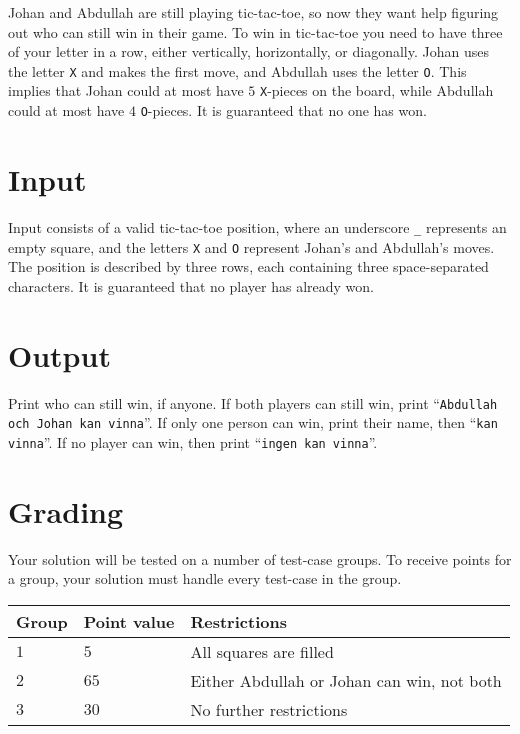 \noindent
Johan and Abdullah are still playing tic-tac-toe, so now they want help figuring out who can still win in their game.
To win in tic-tac-toe you need to have three of your letter in a row, either vertically, horizontally, or diagonally.
Johan uses the letter \texttt{X} and makes the first move, and Abdullah uses the letter \texttt{O}. This implies that Johan could at most have $5$ \texttt{X}-pieces on the board, while Abdullah could at most have $4$ \texttt{O}-pieces.
It is guaranteed that no one has won.

\section*{Input}
\noindent
Input consists of a valid tic-tac-toe position, where an underscore \texttt{\_} represents an empty square, and the letters \texttt{X} and \texttt{O} represent Johan's and Abdullah's moves.
The position is described by three rows, each containing three space-separated characters. It is guaranteed that no player has already won.

\section*{Output}
\noindent
Print who can still win, if anyone.
\noindent
If both players can still win, print ``\texttt{Abdullah och Johan kan vinna}''.
If only one person can win, print their name, then ``\texttt{kan vinna}''.
If no player can win, then print ``\texttt{ingen kan vinna}''.

\section*{Grading}
\noindent
Your solution will be tested on a number of test-case groups.
\noindent
To receive points for a group, your solution must handle every test-case in the group.

\begin{tabular}{| l | l | l |}
\hline
  Group & Point value & Restrictions \\ \hline
  $1$    & $5$       &  All squares are filled \\ \hline
  $2$    & $65$       &  Either Abdullah or Johan can win, not both \\ \hline
  $3$    & $30$       &  No further restrictions \\ \hline
\end{tabular}
